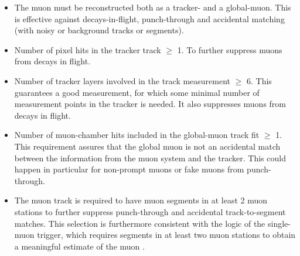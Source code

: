\begin{itemize}
\item The muon must be reconstructed both as a tracker- and a global-muon. This is effective against decays-in-flight, punch-through and accidental matching (with noisy or background tracks or segments).
\item Number of pixel hits in the tracker track $\geq$ 1. To further suppress muons from decays in flight.
\item Number of tracker layers involved in the track measurement $\geq$ 6. This guarantees a good \pt measurement, for which some minimal number of measurement points in the tracker is needed. It also suppresses muons from decays in flight.
\item Number of muon-chamber hits included in the global-muon track fit $\geq$ 1. This requirement assures that the global muon is not an accidental match between the information from the muon system and the tracker. This could happen in particular for non-prompt muons or fake muons from punch-through.
\item The muon track is required to have muon segments in at least 2 muon stations to further suppress punch-through and accidental track-to-segment matches. This selection is furthermore consistent with the logic of the single-muon trigger, which requires segments in at least two muon stations to obtain a meaningful estimate of the muon \pt.

\end{itemize}
